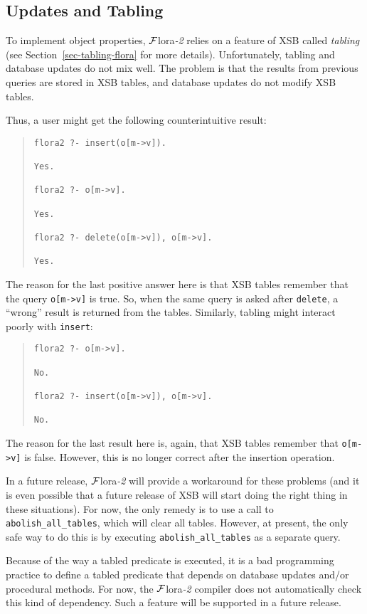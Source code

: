 \documentclass[11pt]{article}
\newcommand{\FLORA}{{\mbox{${\cal F}${\sc lora}\rm\emph{-2}}}\xspace}
\begin{document}
\subsection{Updates and Tabling}


To implement object properties, \FLORA relies on a feature of XSB called
\emph{tabling} (see Section~\ref{sec-tabling-flora} for more details).
Unfortunately, tabling and database updates do not mix well.
The problem is that the results from previous queries are stored in
XSB tables, and database updates do not modify XSB tables.

Thus, a user might get the following counterintuitive result:
\begin{quote}
\begin{verbatim}
flora2 ?- insert(o[m->v]).

Yes.

flora2 ?- o[m->v].

Yes.

flora2 ?- delete(o[m->v]), o[m->v].

Yes.
\end{verbatim}
\end{quote}
The reason for the last positive answer here is that XSB tables remember
that the query {\tt o[m->v]} is true. So, when the same query is asked
after {\tt delete}, a ``wrong'' result is returned from the tables. Similarly,
tabling might interact poorly with {\tt insert}:
\begin{quote}
\begin{verbatim}
flora2 ?- o[m->v].

No.

flora2 ?- insert(o[m->v]), o[m->v].

No.
\end{verbatim}
\end{quote}
The reason for the last result here is, again, that XSB tables
remember that {\tt o[m->v]} is false. However, this is no longer
correct after the insertion operation.

In a future release, \FLORA will provide a workaround for these
problems (and it is even possible that a future release of XSB will
start doing the right thing in these situations). For now, the only
remedy is to use a call to {\tt abolish\_all\_tables}, which will
clear all tables.  However, at present, the only safe way to do this
is by executing {\tt abolish\_all\_tables} as a separate query.

Because of the way a tabled predicate is executed, it is a bad
programming practice to define a tabled predicate that depends on
database updates and/or procedural methods. For now, the \FLORA
compiler does not automatically check this kind of dependency. Such
a feature will be supported in a future release.
\end{document}
